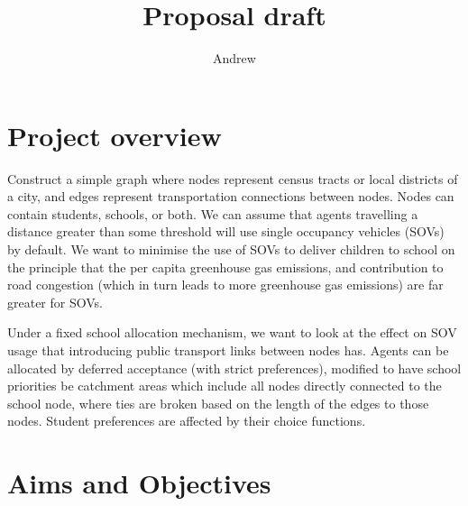 \documentclass{article}
\title{Proposal draft}
\author{Andrew}
\date{}
\begin{document}
\maketitle

\section{Project overview}
Construct a simple graph where nodes represent census tracts or local districts of a city, and edges represent transportation connections between nodes. Nodes can contain students, schools, or both. We can assume that agents travelling a distance greater than some threshold will use single occupancy vehicles (SOVs) by default. We want to minimise the use of SOVs to deliver children to school on the principle that the per capita greenhouse gas emissions, and contribution to road congestion (which in turn leads to more greenhouse gas emissions) are far greater for SOVs.

Under a fixed school allocation mechanism, we want to look at the effect on SOV usage that introducing public transport links between nodes has. Agents can be allocated by deferred acceptance (with strict preferences), modified to have school priorities be catchment areas which include all nodes directly connected to the school node, where ties are broken based on the length of the edges to those nodes. Student preferences are affected by their choice functions.

\section{Aims and Objectives}
\end{document}
